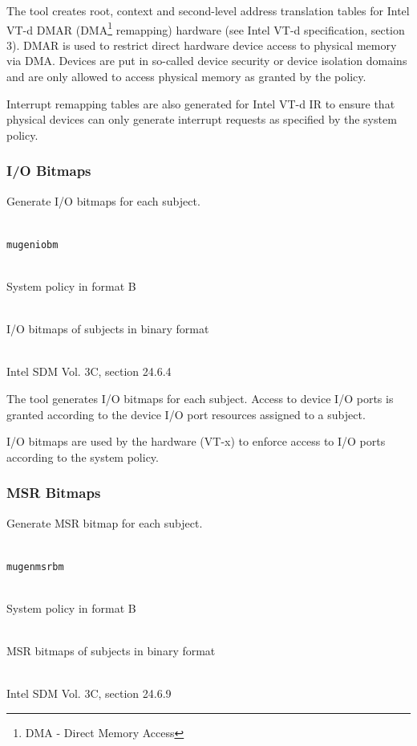 \documentclass[a4paper,twoside,titlepage]{article}
\begin{document}
The tool creates root, context and second-level address translation tables for
Intel VT-d DMAR (DMA\footnote{DMA - Direct Memory Access} remapping) hardware
(see Intel VT-d specification, section 3). DMAR is used to restrict direct
hardware device access to physical memory via DMA. Devices are put in so-called
device security or device isolation domains and are only allowed to access
physical memory as granted by the policy.

Interrupt remapping tables are also generated for Intel VT-d IR to ensure that
physical devices can only generate interrupt requests as specified by the system
policy.

\subsubsection{I/O Bitmaps}
Generate I/O bitmaps for each subject.

\begin{description} \itemsep1pt \parskip0pt
	\item[Name] \hfill \\
		\texttt{mugeniobm}
	\item[Input] \hfill \\
		System policy in format B
	\item[Output] \hfill \\
		I/O bitmaps of subjects in binary format
	\item[Output format] \hfill \\
		Intel SDM Vol. 3C, section 24.6.4
\end{description}

The tool generates I/O bitmaps for each subject. Access to device I/O ports is
granted according to the device I/O port resources assigned to a subject.

I/O bitmaps are used by the hardware (VT-x) to enforce access to I/O ports
according to the system policy.

\subsubsection{MSR Bitmaps}
Generate MSR bitmap for each subject.

\begin{description} \itemsep1pt \parskip0pt
	\item[Name] \hfill \\
		\texttt{mugenmsrbm}
	\item[Input] \hfill \\
		System policy in format B
	\item[Output] \hfill \\
		MSR bitmaps of subjects in binary format
	\item[Output format] \hfill \\
		Intel SDM Vol. 3C, section 24.6.9
\end{description}
\end{document}
